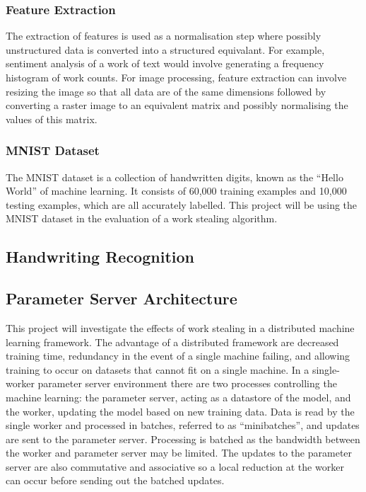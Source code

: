 \documentclass[12pt]{article}
\begin{document}
\subsubsection{Feature Extraction}
The extraction of features is used as a normalisation step where possibly unstructured data is converted into a structured equivalant. For example, sentiment analysis of a work of text would involve generating a frequency histogram of work counts.
\newline
\newline
For image processing, feature extraction can involve resizing the image so that all data are of the same dimensions followed by converting a raster image to an equivalent matrix and possibly normalising the values of this matrix.
\newline
\subsubsection{MNIST Dataset}
The MNIST dataset is a collection of handwritten digits, known as the ``Hello World'' of machine learning. It consists of 60,000 training examples and 10,000 testing examples, which are all accurately labelled. This project will be using the MNIST dataset in the evaluation of a work stealing algorithm.
\newline
\subsection{Handwriting Recognition}
\subsection{Parameter Server Architecture}
This project will investigate the effects of work stealing in a distributed machine learning framework. The advantage of a distributed framework are decreased training time, redundancy in the event of a single machine failing, and allowing training to occur on datasets that cannot fit on a single machine.
\newline
\newline
In a single-worker parameter server environment there are two processes controlling the machine learning: the parameter server, acting as a datastore of the model, and the worker, updating the model based on new training data. Data is read by the single worker and processed in batches, referred to as ``minibatches'', and updates are sent to the parameter server. Processing is batched as the bandwidth between the worker and parameter server may be limited. The updates to the parameter server are also commutative and associative so a local reduction at the worker can occur before sending out the batched updates.
\newline
\end{document}
